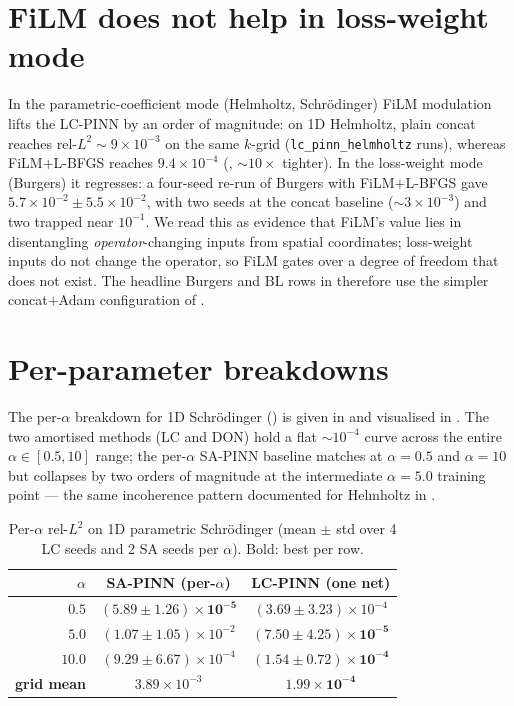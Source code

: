 \documentclass{article}
\theoremstyle{plain}
\theoremstyle{definition}
\theoremstyle{remark}
\begin{document}
\section{FiLM does not help in loss-weight mode}
\label{sec:appendix-film-loss-weight}

In the parametric-coefficient mode (Helmholtz, Schrödinger) FiLM
modulation lifts the LC-PINN by an order of magnitude: on 1D
Helmholtz, plain concat reaches rel-$L^2 \!\sim\!9\!\times\!10^{-3}$
on the same $k$-grid (\texttt{lc\_pinn\_helmholtz} runs), whereas
FiLM$+$L-BFGS reaches $9.4\!\times\!10^{-4}$ (,
$\sim\!10\times$ tighter). In the loss-weight mode (Burgers) it
regresses: a four-seed re-run of Burgers with
FiLM$+$L-BFGS gave $5.7\!\times\!10^{-2} \pm 5.5\!\times\!10^{-2}$,
with two seeds at the concat baseline ($\sim\!3\!\times\!10^{-3}$)
and two trapped near $10^{-1}$. We read this as evidence that
FiLM's value lies in disentangling \emph{operator}-changing inputs
from spatial coordinates; loss-weight inputs do not change the
operator, so FiLM gates over a degree of freedom that does not
exist. The headline Burgers and BL rows in
 therefore use the simpler
concat$+$Adam configuration of \citet{dosovitskiy2020}.

\section{Per-parameter breakdowns}
\label{sec:appendix-per-param}

The per-$\alpha$ breakdown for 1D Schrödinger
() is given in
 and visualised in
. The two
amortised methods (LC and DON) hold a flat $\sim\!10^{-4}$ curve
across the entire $\alpha\in[0.5,10]$ range; the per-$\alpha$
SA-PINN baseline matches at $\alpha=0.5$ and $\alpha=10$ but
collapses by two orders of magnitude at the intermediate
$\alpha=5.0$ training point --- the same incoherence pattern
documented for Helmholtz in .

\begin{table}[!t]
\centering
\caption{Per-$\alpha$ rel-$L^2$ on 1D parametric Schrödinger
(mean $\pm$ std over 4 LC seeds and 2 SA seeds per $\alpha$).
Bold: best per row.}
\label{tab:schrod-per-alpha}
\small
\begin{tabular}{r|cc}
\toprule
$\alpha$ & SA-PINN (per-$\alpha$) & LC-PINN (one net) \\
\midrule
$0.5$  & $\mathbf{(5.89\!\pm\!1.26)\!\times\!10^{-5}}$ & $(3.69\!\pm\!3.23)\!\times\!10^{-4}$ \\
$5.0$  & $(1.07\!\pm\!1.05)\!\times\!10^{-2}$ & $\mathbf{(7.50\!\pm\!4.25)\!\times\!10^{-5}}$ \\
$10.0$ & $(9.29\!\pm\!6.67)\!\times\!10^{-4}$ & $\mathbf{(1.54\!\pm\!0.72)\!\times\!10^{-4}}$ \\
\midrule
\textbf{grid mean} & $3.89\!\times\!10^{-3}$ & $\mathbf{1.99\!\times\!10^{-4}}$ \\
\bottomrule
\end{tabular}
\end{table}
\end{document}
